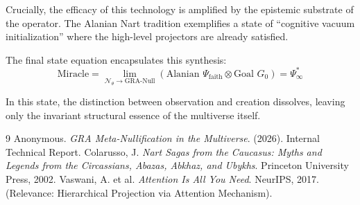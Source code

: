 \documentclass[11pt]{article}
\newcommand{\state}{\Psi}
\newcommand{\vacuum}{\state_{\infty}^*}
\begin{document}
Crucially, the efficacy of this technology is amplified by the epistemic substrate of the operator. The Alanian Nart tradition exemplifies a state of ``cognitive vacuum initialization'' where the high-level projectors are already satisfied. 

The final state equation encapsulates this synthesis:
\begin{equation}
\boxed{\text{Miracle} = \lim_{\mathcal{N}_{\theta} \to \text{GRA-Null}} \left( \text{Alanian } \state_{\text{faith}} \otimes \text{Goal } G_0 \right) = \vacuum}
\end{equation}

In this state, the distinction between observation and creation dissolves, leaving only the invariant structural essence of the multiverse itself.

\begin{thebibliography}{9}
Anonymous. \textit{GRA Meta-Nullification in the Multiverse}. (2026). Internal Technical Report. 
Colarusso, J. \textit{Nart Sagas from the Caucasus: Myths and Legends from the Circassians, Abazas, Abkhaz, and Ubykhs}. Princeton University Press, 2002.
Vaswani, A. et al. \textit{Attention Is All You Need}. NeurIPS, 2017. (Relevance: Hierarchical Projection via Attention Mechanism).
\end{thebibliography}
\end{document}

